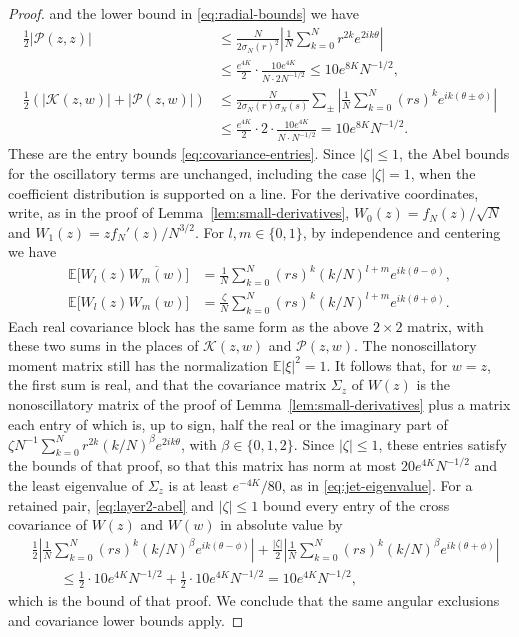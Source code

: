 \begin{proof}
and the lower bound in \eqref{eq:radial-bounds} we have
\begin{align*}
 \tfrac12|\mathcal P(z,z)|
 &\le\frac N{2\sigma_N(r)^2}
 \left|\frac1N\sum_{k=0}^Nr^{2k}e^{2ik\theta}\right|\\
 &\le\frac{e^{4K}}2\cdot\frac{10e^{4K}}{N\cdot2N^{-1/2}}
 \le10e^{8K}N^{-1/2},\\
 \tfrac12(|\mathcal K(z,w)|+|\mathcal P(z,w)|)
 &\le\frac N{2\sigma_N(r)\sigma_N(s)}\sum_{\pm}
 \left|\frac1N\sum_{k=0}^N(rs)^ke^{ik(\theta\pm\phi)}\right|\\
 &\le\frac{e^{4K}}2\cdot2\cdot\frac{10e^{4K}}{N\cdot N^{-1/2}}
 =10e^{8K}N^{-1/2}.
\end{align*}
These are the entry bounds \eqref{eq:covariance-entries}.
Since $|\zeta|\le1$, the Abel bounds for the oscillatory terms are
unchanged, including the case $|\zeta|=1$, when the coefficient
distribution is supported on a line.
For the derivative coordinates, write, as in the proof of
Lemma~\ref{lem:small-derivatives}, $W_0(z)=f_N(z)/\sqrt N$ and
$W_1(z)=zf_N'(z)/N^{3/2}$.
For $l,m\in\{0,1\}$, by independence and centering we have
\begin{align*}
 \mathbb E\bigl[W_l(z)\overline{W_m(w)}\bigr]
 &=\frac1N\sum_{k=0}^N(rs)^k(k/N)^{l+m}e^{ik(\theta-\phi)},\\
 \mathbb E\bigl[W_l(z)W_m(w)\bigr]
 &=\frac{\zeta}{N}\sum_{k=0}^N(rs)^k(k/N)^{l+m}e^{ik(\theta+\phi)}.
\end{align*}
Each real covariance block has the same form as the above
$2\times2$ matrix, with these two sums in the places of
$\mathcal K(z,w)$ and $\mathcal P(z,w)$.
The nonoscillatory moment matrix still has the normalization
$\mathbb E|\xi|^2=1$.
It follows that, for $w=z$, the first sum is real, and that the covariance
matrix $\Sigma_z$ of $W(z)$ is the nonoscillatory matrix of the proof of
Lemma~\ref{lem:small-derivatives} plus a matrix each entry of which is,
up to sign, half the real or the imaginary part of
$\zeta N^{-1}\sum_{k=0}^Nr^{2k}(k/N)^\beta e^{2ik\theta}$, with
$\beta\in\{0,1,2\}$.
Since $|\zeta|\le1$, these entries satisfy the bounds of that proof, so
that this matrix has norm at most $20e^{4K}N^{-1/2}$ and the least
eigenvalue of $\Sigma_z$ is at least $e^{-4K}/80$, as in
\eqref{eq:jet-eigenvalue}.
For a retained pair, \eqref{eq:layer2-abel} and $|\zeta|\le1$ bound every
entry of the cross covariance of $W(z)$ and $W(w)$ in absolute value by
\begin{align*}
 &\frac12\left|\frac1N\sum_{k=0}^N(rs)^k(k/N)^\beta e^{ik(\theta-\phi)}
 \right|
 +\frac{|\zeta|}2\left|\frac1N\sum_{k=0}^N(rs)^k(k/N)^\beta
 e^{ik(\theta+\phi)}\right|\\
 &\qquad\le\frac12\cdot10e^{4K}N^{-1/2}+\frac12\cdot10e^{4K}N^{-1/2}
 =10e^{4K}N^{-1/2},
\end{align*}
which is the bound of that proof.
We conclude that the same angular exclusions and covariance lower bounds
apply.


\end{proof}
